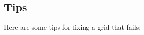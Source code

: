 \documentclass[xcolor=rgb,svgnames,dvipsnames]{article}
\newcommand{\figures}{../fig}
\begin{document}
% 
% 



\clearpage
\subsection{Tips}

Here are some tips for fixing a grid that fails:
\end{document}
